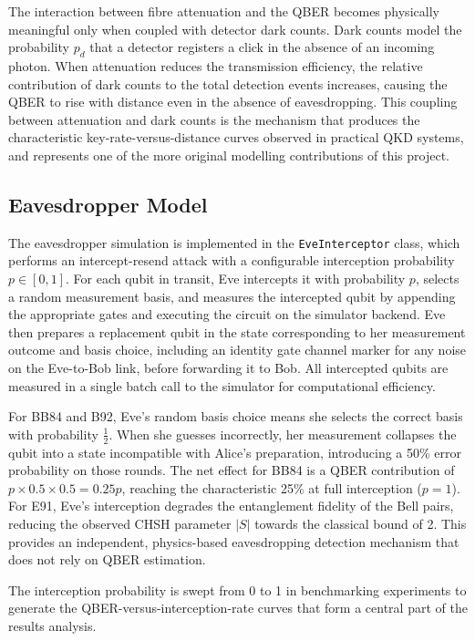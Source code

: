 \documentclass[10pt, a4paper]{report}
\begin{document}
The interaction between fibre attenuation and the QBER becomes physically meaningful only when coupled with detector dark counts. Dark counts model the probability $p_d$ that a detector registers a click in the absence of an incoming photon. When attenuation reduces the transmission efficiency, the relative contribution of dark counts to the total detection events increases, causing the QBER to rise with distance even in the absence of eavesdropping. This coupling between attenuation and dark counts is the mechanism that produces the characteristic key-rate-versus-distance curves observed in practical QKD systems, and represents one of the more original modelling contributions of this project.

\subsection{Eavesdropper Model}

The eavesdropper simulation is implemented in the \texttt{EveInterceptor} class, which performs an intercept-resend attack with a configurable interception probability $p \in [0, 1]$. For each qubit in transit, Eve intercepts it with probability $p$, selects a random measurement basis, and measures the intercepted qubit by appending the appropriate gates and executing the circuit on the simulator backend. Eve then prepares a replacement qubit in the state corresponding to her measurement outcome and basis choice, including an identity gate channel marker for any noise on the Eve-to-Bob link, before forwarding it to Bob. All intercepted qubits are measured in a single batch call to the simulator for computational efficiency.

For BB84 and B92, Eve's random basis choice means she selects the correct basis with probability $\frac{1}{2}$. When she guesses incorrectly, her measurement collapses the qubit into a state incompatible with Alice's preparation, introducing a 50\% error probability on those rounds. The net effect for BB84 is a QBER contribution of $p \times 0.5 \times 0.5 = 0.25p$, reaching the characteristic 25\% at full interception ($p = 1$). For E91, Eve's interception degrades the entanglement fidelity of the Bell pairs, reducing the observed CHSH parameter $|S|$ towards the classical bound of 2. This provides an independent, physics-based eavesdropping detection mechanism that does not rely on QBER estimation.

The interception probability is swept from 0 to 1 in benchmarking experiments to generate the QBER-versus-interception-rate curves that form a central part of the results analysis.
\end{document}
